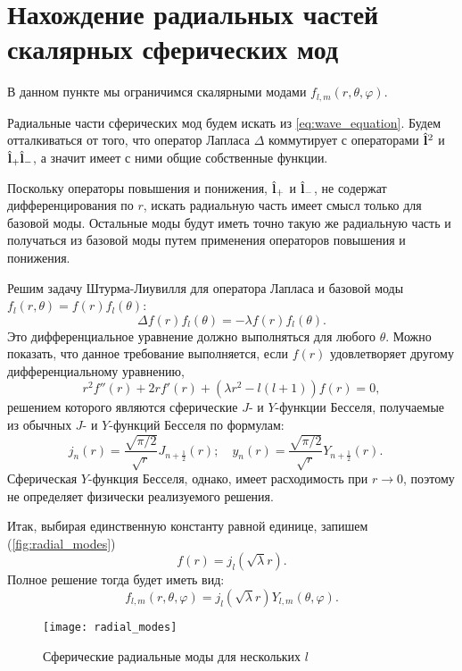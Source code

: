 \documentclass[12pt,a4paper]{article}
\begin{document}
    \section{Нахождение радиальных частей скалярных сферических мод}

        В данном пункте мы ограничимся скалярными модами $f_{l,m}(r,\theta,\varphi)$.

        Радиальные части сферических мод будем искать из \autoref{eq:wave_equation}. Будем отталкиваться от того, что оператор Лапласа $\Delta$ коммутирует с операторами $\hat{\mathbf{l}}^2$ и $\hat{\mathbf{l}}_{+} \hat{\mathbf{l}}_{-}$, а значит имеет с ними общие собственные функции.

        Поскольку операторы повышения и понижения, $\hat{\mathbf{l}}_{+}$ и $\hat{\mathbf{l}}_{-}$, не содержат дифференцирования по $r$, искать радиальную часть имеет смысл только для базовой моды. Остальные моды будут иметь точно такую же радиальную часть и получаться из базовой моды путем применения операторов повышения и понижения.

        Решим задачу Штурма-Лиувилля для оператора Лапласа и базовой моды $f_{l}(r,\theta) = f(r) f_{l}(\theta)$:
        \begin{equation}
            \Delta f(r) f_{l}(\theta) = - \lambda f(r) f_{l}(\theta) .
        \end{equation}
        Это дифференциальное уравнение должно выполняться для любого $\theta$. Можно показать, что данное требование выполняется, если $f(r)$ удовлетворяет другому дифференциальному уравнению,
        \begin{equation}
            r^2 f''(r) + 2 r f'(r) + (\lambda r^2 - l(l+1)) f(r) = 0 ,
        \end{equation}
        решением которого являются сферические $J$- и $Y$-функции Бесселя, получаемые из обычных $J$- и $Y$-функций Бесселя по формулам:
        \begin{equation}
            j_n(r) = \frac{\sqrt{\pi/2}}{\sqrt{r}} J_{n+\frac{1}{2}}(r) ; \quad
            y_n(r) = \frac{\sqrt{\pi/2}}{\sqrt{r}} Y_{n+\frac{1}{2}}(r) . \quad
        \end{equation}
        Сферическая $Y$-функция Бесселя, однако, имеет расходимость при $r \to 0$, поэтому не определяет физически реализуемого решения.

        Итак, выбирая единственную константу равной единице, запишем (\autoref{fig:radial_modes})
        \begin{equation}
            f(r) = j_l(\sqrt{\lambda} r) .
        \end{equation}
        Полное решение тогда будет иметь вид:
        \begin{equation}
            f_{l,m}(r,\theta,\varphi)
                = j_l(\sqrt{\lambda} r) Y_{l,m}(\theta,\varphi) .
        \end{equation}
        \begin{figure}[h]
            \centering
            \texttt{[image: radial\_modes]}
            \caption[]{Сферические радиальные моды для нескольких $l$}
            \label{fig:radial_modes}
        \end{figure}
\end{document}
